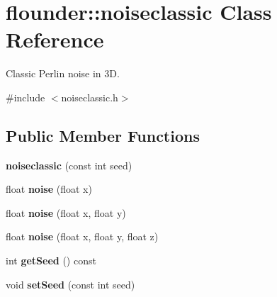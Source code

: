 \hypertarget{classflounder_1_1noiseclassic}{}\section{flounder\+:\+:noiseclassic Class Reference}
\label{classflounder_1_1noiseclassic}


Classic Perlin noise in 3D.  




{\ttfamily \#include $<$noiseclassic.\+h$>$}

\subsection*{Public Member Functions}
\begin{DoxyCompactItemize}
\item 
\mbox{\label{classflounder_1_1noiseclassic_a8652ce4926fa994fcb4fb70197cb8edd}} 
{\bfseries noiseclassic} (const int seed)
\item 
\mbox{\label{classflounder_1_1noiseclassic_a7d05ded3dca28de98791b9f97986c645}} 
float {\bfseries noise} (float x)
\item 
\mbox{\label{classflounder_1_1noiseclassic_aa2dbbf8fd7c2962bf0710470df95ed8b}} 
float {\bfseries noise} (float x, float y)
\item 
\mbox{\label{classflounder_1_1noiseclassic_a082d6549eacc7eabe398a612189c1349}} 
float {\bfseries noise} (float x, float y, float z)
\item 
\mbox{\label{classflounder_1_1noiseclassic_a9163a2c91681fe0fcf4a45fe875ee977}} 
int {\bfseries get\+Seed} () const
\item 
\mbox{\label{classflounder_1_1noiseclassic_a264cf8388bd9f507740fb58c122b0b42}} 
void {\bfseries set\+Seed} (const int seed)
\end{DoxyCompactItemize}
